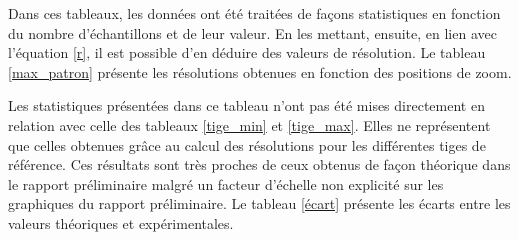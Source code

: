 \documentclass[11pt,letterpaper]{article}
\begin{document}
Dans ces tableaux, les données ont été traitées de façons statistiques en fonction du nombre d'échantillons et de leur valeur. En les mettant, ensuite, en lien avec l'équation \ref{r}, il est possible d'en déduire des valeurs de résolution. Le tableau \ref{max_patron} présente les résolutions obtenues en fonction des positions de zoom. 

\begin{table}[h!]
\centering
{}
\caption{Tableau de la résolution en fonction de la position du zoom.}
\label{max_patron}
\end{table}

Les statistiques présentées dans ce tableau n'ont pas été mises directement en relation avec celle des tableaux \ref{tige_min} et \ref{tige_max}. Elles ne représentent que celles obtenues grâce au calcul des résolutions pour les différentes tiges de référence. Ces résultats sont très proches de ceux obtenus de façon théorique dans le rapport préliminaire malgré un facteur d'échelle non explicité sur les graphiques du rapport préliminaire. Le tableau \ref{écart} présente les écarts entre les valeurs théoriques et expérimentales. 

\begin{table}[h!]
\centering
{}
\caption{Tableau des écarts entre les valeurs théoriques et expérimentales.}
\label{écart}
\end{table}
\end{document}
